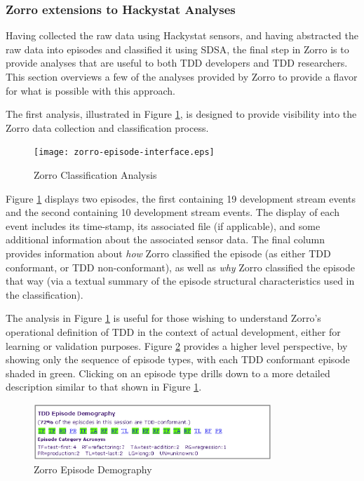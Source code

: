 \documentclass[11pt,twocolumn]{article}
\begin{document}
\subsubsection{Zorro extensions to Hackystat Analyses}

Having collected the raw data using Hackystat sensors, and having
abstracted the raw data into episodes and classified it using SDSA, the
final step in Zorro is to provide analyses that are useful to both TDD
developers and TDD researchers.  This section overviews a few of the
analyses provided by Zorro to provide a flavor for what is possible with
this approach.

The first analysis, illustrated in Figure \ref{fig:Analysis-Table}, is
designed to provide visibility into the Zorro data collection and
classification process.

\begin{figure}[th]
  \center
  \texttt{[image: zorro-episode-interface.eps]}
  \caption{Zorro Classification Analysis}
  \label{fig:Analysis-Table}
\end{figure} 

Figure \ref{fig:Analysis-Table} displays two episodes, the first containing
19 development stream events and the second containing 10 development
stream events.  The display of each event includes its time-stamp, its
associated file (if applicable), and some additional information about the
associated sensor data.  The final column provides information about {\em
how} Zorro classified the episode (as either TDD conformant, or TDD
non-conformant), as well as {\em why} Zorro classified the episode that way
(via a textual summary of the episode structural characteristics used in
the classification).  

The analysis in Figure \ref{fig:Analysis-Table} is useful for those wishing
to understand Zorro's operational definition of TDD in the context of
actual development, either for learning or validation purposes.  Figure
\ref{fig:Analysis-Demography} provides a higher level perspective, by
showing only the sequence of episode types, with each TDD conformant
episode shaded in green. Clicking on an episode type drills down to a more
detailed description similar to that shown in Figure
\ref{fig:Analysis-Table}.

\begin{figure}[th]
  \center
  \includegraphics[width=0.80\textwidth]{zorro-episode-demography.eps}
  \caption{Zorro Episode Demography}
  \label{fig:Analysis-Demography}
\end{figure} 
\end{document}
